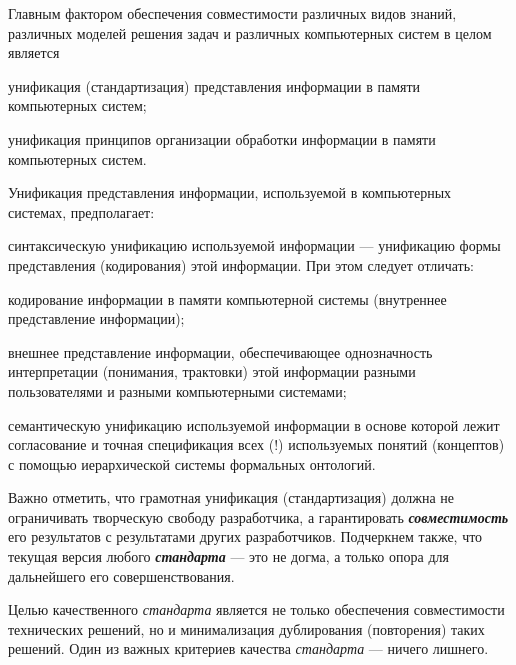 Главным фактором обеспечения совместимости различных видов знаний, различных моделей решения задач и различных компьютерных систем в целом является 
\begin{textitemize}
    \item унификация (стандартизация) представления информации в памяти компьютерных систем;
    \item унификация принципов организации обработки информации в памяти компьютерных систем.
\end{textitemize}

Унификация представления информации, используемой в компьютерных системах, предполагает:
\begin{textitemize}
    \item синтаксическую унификацию используемой информации --- унификацию формы представления (кодирования) этой информации. При этом следует отличать:
    \begin{textitemize}
	    	\item кодирование информации в памяти компьютерной системы (внутреннее представление информации);
	    	\item внешнее представление информации, обеспечивающее однозначность интерпретации (понимания, трактовки) этой информации разными пользователями и разными компьютерными системами;
	    \end{textitemize}
    \item семантическую унификацию используемой информации в основе которой лежит согласование и точная спецификация всех (!) используемых понятий (концептов) с помощью иерархической системы формальных онтологий.
\end{textitemize}

Важно отметить, что грамотная унификация (стандартизация) должна не ограничивать творческую свободу разработчика, а гарантировать \textbf{\textit{совместимость}} его результатов с результатами других разработчиков. Подчеркнем также, что текущая версия любого \textbf{\textit{стандарта}} --- это не догма, а только опора для дальнейшего его совершенствования.

Целью качественного \textit{стандарта} является не только обеспечения совместимости технических решений, но и минимализация дублирования (повторения) таких решений. Один из важных критериев качества \textit{стандарта} --- ничего лишнего.

\begin{SCn}
\end{SCn}

